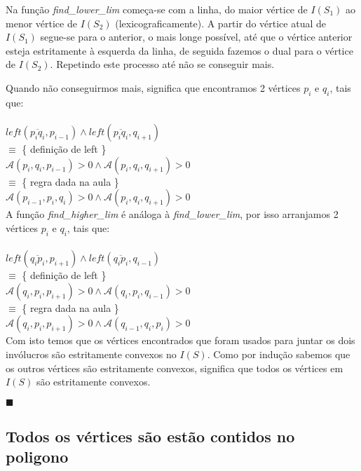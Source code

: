 \documentclass[11pt]{article}
\begin{document}
Na função \textit{find\_lower\_lim} começa-se com a linha,
do maior vértice de $I(S_1)$ ao menor vértice de $I(S_2)$ (lexicograficamente).
A partir do vértice atual de $I(S_1)$ segue-se para o anterior, o mais 
longe possível, até que o vértice anterior esteja estritamente à
esquerda da linha, de seguida fazemos o dual para o vértice de $I(S_2)$.
Repetindo este processo até não se conseguir mais.\par
Quando não conseguirmos mais, significa que encontramos 2 vértices 
$p_i$ e $q_i$, tais que:\\
\\
$left(\overline{p_i q_i}, p_{i-1}) \wedge left(\overline{p_i q_i}, q_{i+1})$\\
$\equiv$ \{ definição de left \}\\
$\mathcal{A}(p_i, q_i, p_{i-1}) > 0 \wedge \mathcal{A}(p_i, q_i, q_{i+1}) > 0$\\
$\equiv$ \{ regra dada na aula \}\\
$\mathcal{A}(p_{i-1}, p_i, q_i) > 0 \wedge \mathcal{A}(p_i, q_i, q_{i+1}) > 0$\\

A função \textit{find\_higher\_lim} é análoga à \textit{find\_lower\_lim},
por isso arranjamos 2 vértices $p_i$ e $q_i$, tais que:\\
\\
$left(\overline{q_i p_i}, p_{i+1}) \wedge left(\overline{q_i p_i}, q_{i-1})$\\
$\equiv$ \{ definição de left \}\\
$\mathcal{A}(q_i, p_i, p_{i+1}) > 0 \wedge \mathcal{A}(q_i, p_i, q_{i-1}) > 0$\\
$\equiv$ \{ regra dada na aula \}\\
$\mathcal{A}(q_i, p_i, p_{i+1}) > 0 \wedge \mathcal{A}(q_{i-1}, q_i, p_i) > 0$\\

Com isto temos que os vértices encontrados que foram 
usados para juntar os dois invólucros são estritamente
convexos no $I(S)$. Como por indução sabemos que os 
outros vértices são estritamente convexos, significa
que todos os vértices em $I(S)$ são estritamente convexos.



\hfill $\blacksquare$

\subsection{Todos os vértices são estão contidos no poligono}
\end{document}
